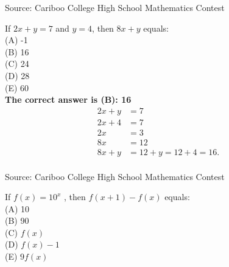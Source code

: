 \documentclass{article}
\begin{document}
\parindent=0cm
\parskip=6pt
\pagestyle{empty}


\scriptsize
Source: Cariboo College High School Mathematics Contest

\normalsize
If $2x+y=7$ and $y=4$, then $8x+y$ equals:\\
(A) -1\\
(B) 16\\
(C) 24\\
(D) 28\\
(E) 60\\


\textbf{The correct answer is (B): 16}\\[1 ex]
\begin{align*}
2x+y&=7\\
2x+4&=7\\
2x&=3\\
8x&=12\\
8x+y&=12+y=12+4=16.
\end{align*}
\\[5 ex]

\scriptsize
Source: Cariboo College High School Mathematics Contest

\normalsize
If $f(x)=10^x$ , then $f(x+1)-f(x)$ equals:\\
(A) 10\\
(B) 90\\
(C) $f(x)$\\
(D) $f(x)-1$\\
(E) $9f(x)$\\
\end{document}
